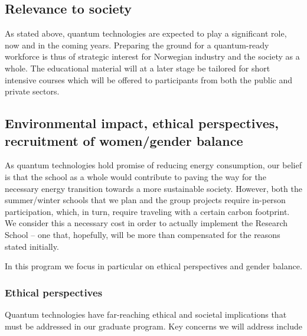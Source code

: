 \documentclass{scrreprt}
\begin{document}
\subsection{Relevance to society}
As stated above, quantum technologies are expected to play a significant role, now and in the coming years. Preparing the ground for a quantum-ready workforce is thus of strategic interest for Norwegian industry and the society as a whole. 
The educational material will at a later stage be tailored for short intensive courses which will be offered to participants from both the public and private sectors. 

\subsection{Environmental impact, ethical perspectives, recruitment of women/gender balance }

As quantum technologies hold promise of reducing energy consumption, our belief is that the school as a whole would contribute to paving the way for the necessary energy transition towards a more sustainable society. However, both the summer/winter schools that we plan and the group projects require in-person participation, which, in turn, require traveling with a certain carbon footprint. We consider this a necessary cost in order to actually implement the Research School -- one that, hopefully, will be more than compensated for the reasons stated initially.

In this program we focus in particular on ethical perspectives and gender balance.

\subsubsection{Ethical perspectives}
Quantum technologies have far-reaching ethical and societal implications that must be addressed in our  graduate program. Key concerns we will address include
\end{document}
